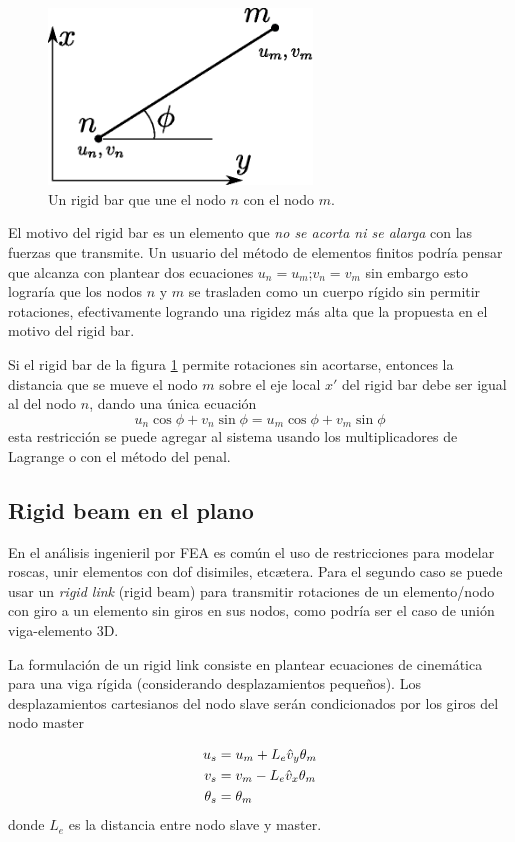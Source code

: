 \documentclass[11pt, a4paper,titlepage]{article}
\begin{document}
\begin{figure}[htb!]
	\centering
	\includegraphics[width=7cm]{fig/rigidbarschematic.eps}
	\caption{Un rigid bar que une el nodo $n$ con el nodo $m$.}
	\label{fig:rigidbarschematic}
\end{figure}

El motivo del rigid bar es un elemento que \textit{no se acorta ni se alarga} con las fuerzas que transmite. Un usuario del método de elementos finitos podría pensar que alcanza con plantear dos ecuaciones $u_n=u_m$;$v_n=v_m$ sin embargo esto lograría que los nodos $n$ y $m$ se trasladen como un cuerpo rígido sin permitir rotaciones, efectivamente logrando una rigidez más alta que la propuesta en el motivo del rigid bar.

Si el rigid bar de la figura \ref{fig:rigidbarschematic} permite rotaciones sin acortarse, entonces la distancia que se mueve el nodo $m$ sobre el eje local $x'$ del rigid bar debe ser igual al del nodo $n$, dando una única ecuación
\[
u_n\cos\phi + v_n \sin\phi = u_m\cos\phi +v_m\sin\phi  
\]
esta restricción se puede agregar al sistema usando los multiplicadores de Lagrange o con el método del penal.


\subsection*{Rigid beam en el plano}
En el análisis ingenieril por FEA es común el uso de restricciones para modelar roscas, unir elementos con dof disimiles, etcætera. Para el segundo caso se puede usar un \textit{rigid link} (rigid beam) para transmitir rotaciones de un elemento/nodo con giro a un elemento sin giros en sus nodos, como podría ser el caso de unión viga-elemento 3D.

La formulación de un rigid link consiste en plantear ecuaciones de cinemática para una viga rígida (considerando desplazamientos pequeños). Los desplazamientos cartesianos del nodo slave serán condicionados por los giros del nodo master

\begin{align*}
	u_s &= u_m  + L_e \hat{v}_y\theta_m \\
	v_s &= v_m  - L_e \hat{v}_x \theta_m \\
	\theta_s &= \theta_m
\end{align*}
donde $L_e$ es la distancia entre nodo slave y master.
\end{document}
